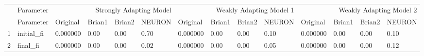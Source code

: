 \begin{tabular}{llllllllllllll}
 & Parameter & \multicolumn{4}{r}{Strongly Adapting Model} & \multicolumn{4}{r}{Weakly Adapting Model 1} & \multicolumn{4}{r}{Weakly Adapting Model 2} \\
 & Parameter & Original & Brian1 & Brian2 & NEURON & Original & Brian1 & Brian2 & NEURON & Original & Brian1 & Brian2 & NEURON \\
1 & initial_fi & 0.000000 & 0.00 & 0.00 & 0.70 & 0.000000 & 0.00 & 0.00 & 0.10 & 0.000000 & 0.00 & 0.00 & 0.10 \\
2 & final_fi & 0.000000 & 0.00 & 0.00 & 0.02 & 0.000000 & 0.00 & 0.00 & 0.05 & 0.000000 & 0.00 & 0.00 & 0.12 \\
\end{tabular}
